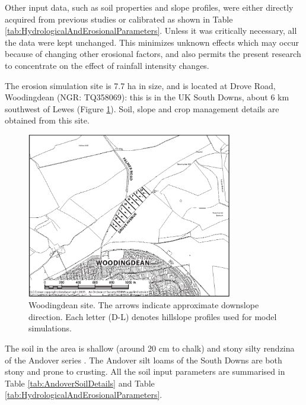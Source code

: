 Other input data, such as soil properties and slope profiles, were either
directly acquired from previous studies \citep{favis-mortlock1998-141} or
calibrated as shown in Table \ref{tab:HydrologicalAndErosionalParameters}.
Unless it was critically necessary, all the data were kept unchanged. This
minimizes unknown effects which may occur because of changing other erosional
factors, and also permits the present research to concentrate on the effect of
rainfall intensity changes.

The erosion simulation site is 7.7 ha in size, and is located at Drove Road,
Woodingdean (NGR: TQ358069): this is in the UK South Downs, about 6 km southwest
of Lewes (Figure \ref{fig:WoodingdeanSite}). Soil, slope and crop management
details are obtained from this site.

\begin{figure}[phtb]
  \centering
    \includegraphics[width=0.8\textwidth]{./img/woodingdean}
  \caption[Woodingdean site]{Woodingdean site. The arrows indicate
approximate downslope direction. Each letter (D-L) denotes hillslope profiles
used for model simulations.}
  \label{fig:WoodingdeanSite}
\end{figure}

The soil in the area is shallow (around 20 cm to chalk) and stony silty rendzina
of the Andover series \citep{jarvis1984-soils}. The Andover silt loams of the
South Downs are both stony and prone to crusting. All the soil input parameters
are summarised in Table \ref{tab:AndoverSoilDetails} and Table
\ref{tab:HydrologicalAndErosionalParameters}.

